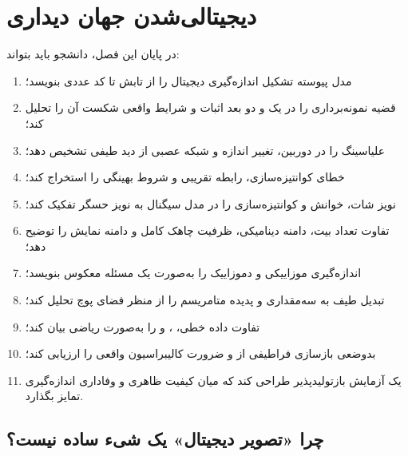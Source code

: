 \documentclass[12pt,openany,oneside]{book}
\begin{document}
\tableofcontents

\mainmatter
\setcounter{chapter}{1}
\chapter{دیجیتالی‌شدن جهان دیداری}
\label{ch:digitization}

\begin{learningbox}
در پایان این فصل، دانشجو باید بتواند:
\begin{enumerate}
\item مدل پیوسته تشکیل اندازه‌گیری دیجیتال را از تابش تا کد عددی بنویسد؛
\item قضیه نمونه‌برداری را در یک و دو بعد اثبات و شرایط واقعی شکست آن را تحلیل کند؛
\item علیاسینگ را در دوربین، تغییر اندازه و شبکه عصبی از دید طیفی تشخیص دهد؛
\item خطای کوانتیزه‌سازی، رابطه تقریبی  و شروط بهینگی  را استخراج کند؛
\item نویز شات، خوانش و کوانتیزه‌سازی را در مدل سیگنال به نویز حسگر تفکیک کند؛
\item تفاوت تعداد بیت، دامنه دینامیکی، ظرفیت چاهک کامل و دامنه نمایش را توضیح دهد؛
\item اندازه‌گیری موزاییکی  و دموزاییک را به‌صورت یک مسئله معکوس بنویسد؛
\item تبدیل طیف به سه‌مقداری  و پدیده متامریسم را از منظر فضای پوچ تحلیل کند؛
\item تفاوت داده خطی، ،  و  را به‌صورت ریاضی بیان کند؛
\item بدوضعی بازسازی فراطیفی از  و ضرورت کالیبراسیون واقعی را ارزیابی کند؛
\item یک آزمایش بازتولیدپذیر طراحی کند که میان کیفیت ظاهری و وفاداری اندازه‌گیری تمایز بگذارد.
\end{enumerate}
\end{learningbox}

\section{چرا «تصویر دیجیتال» یک شیء ساده نیست؟}
\end{document}
